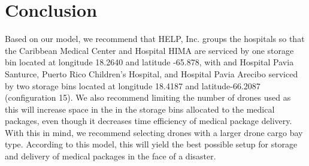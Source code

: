 \documentclass[twocolumn,10pt]{asme2ej}
\begin{document}
\section{Conclusion}
Based on our model, we recommend that HELP, Inc. groups the hospitals so that the Caribbean Medical Center and Hospital HIMA are serviced by one storage bin located at longitude 18.2640 and latitude -65.878, with and Hospital Pavia Santurce, Puerto Rico Children's Hospital, and Hospital Pavia Arecibo serviced by two storage bins located at longitude 18.4187 and latitude-66.2087 (configuration 15). We also recommend limiting the number of drones used as this will increase space in the in the storage bins allocated to the medical packages, even though it decreases time efficiency of medical package delivery. With this in mind, we recommend selecting drones with a larger drone cargo bay type. According to this model, this will yield the best possible setup for storage and delivery of medical packages in the face of a disaster.




\end{document}
